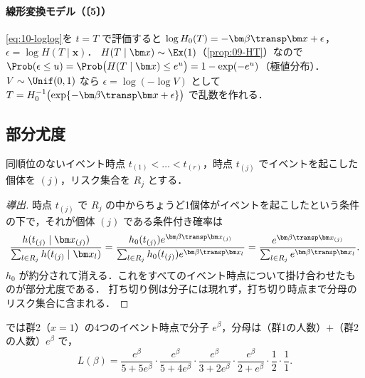 \paragraph{線形変換モデル（〔5〕）}
\cref{eq:10-loglog}を $t=T$ で評価すると $\log H_0(T)=-\bm\beta\transp\bm x+\epsilon$，$\epsilon=\log H(T\mid\bm x)$．
$H(T\mid\bm x)\sim\Ex(1)$（\cref{prop:09-HT}）なので $\Prob(\epsilon\le u)=\Prob\bigl(H(T\mid\bm x)\le e^u\bigr)=1-\exp(-e^u)$（極値分布）．
$V\sim\Unif(0,1)$ なら $\epsilon=\log(-\log V)$ として $T=H_0^{-1}\bigl(\exp\{-\bm\beta\transp\bm x+\epsilon\}\bigr)$ で乱数を作れる．

\subsection{部分尤度}\label{subsec:10-partial}
\Hissu 同順位のないイベント時点 $t_{(1)}<\dots<t_{(r)}$，時点 $t_{(j)}$ でイベントを起こした個体を $(j)$，リスク集合を $R_j$ とする．
\begin{proof}[導出]
時点 $t_{(j)}$ で $R_j$ の中からちょうど1個体がイベントを起こしたという条件の下で，それが個体 $(j)$ である条件付き確率は
\[
\frac{h(t_{(j)}\mid\bm x_{(j)})}{\sum_{l\in R_j}h(t_{(j)}\mid\bm x_l)}=\frac{h_0(t_{(j)})e^{\bm\beta\transp\bm x_{(j)}}}{\sum_{l\in R_j}h_0(t_{(j)})e^{\bm\beta\transp\bm x_l}}
=\frac{e^{\bm\beta\transp\bm x_{(j)}}}{\sum_{l\in R_j}e^{\bm\beta\transp\bm x_l}}.
\]
$h_0$ が約分されて消える．これをすべてのイベント時点について掛け合わせたものが部分尤度である．
打ち切り例は分子には現れず，打ち切り時点まで分母のリスク集合に含まれる．
\end{proof}
 では群2（$x=1$）の4つのイベント時点で分子 $e^\beta$，分母は（群1の人数）$+$（群2の人数）$e^\beta$ で，
\[
L(\beta)=\frac{e^\beta}{5+5e^\beta}\cdot\frac{e^\beta}{5+4e^\beta}\cdot\frac{e^\beta}{3+2e^\beta}\cdot\frac{e^\beta}{2+e^\beta}\cdot\frac12\cdot\frac11.
\]

